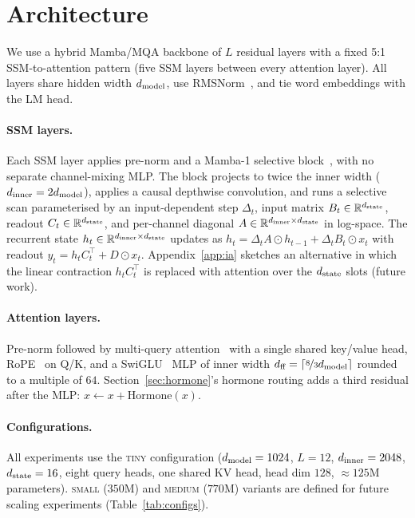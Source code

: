 \section{Architecture}
\label{sec:arch}

We use a hybrid Mamba/MQA backbone of $L$ residual layers with a fixed 5:1 SSM-to-attention pattern (five SSM layers between every attention layer). All layers share hidden width $d_{\text{model}}$, use RMSNorm~\citep{zhang2019root}, and tie word embeddings with the LM head.

\paragraph{SSM layers.} Each SSM layer applies pre-norm and a Mamba-1 selective block~\citep{gu2023mamba}, with no separate channel-mixing MLP. The block projects to twice the inner width ($d_{\text{inner}} = 2d_{\text{model}}$), applies a causal depthwise convolution, and runs a selective scan parameterised by an input-dependent step $\Delta_t$, input matrix $B_t \in \mathbb{R}^{d_{\text{state}}}$, readout $C_t \in \mathbb{R}^{d_{\text{state}}}$, and per-channel diagonal $A \in \mathbb{R}^{d_{\text{inner}} \times d_{\text{state}}}$ in log-space. The recurrent state $h_t \in \mathbb{R}^{d_{\text{inner}} \times d_{\text{state}}}$ updates as $h_t = \Delta_t A \odot h_{t-1} + \Delta_t B_t \odot x_t$ with readout $y_t = h_t C_t^\top + D \odot x_t$. Appendix~\ref{app:ia} sketches an alternative in which the linear contraction $h_t C_t^\top$ is replaced with attention over the $d_{\text{state}}$ slots (future work).

\paragraph{Attention layers.} Pre-norm followed by multi-query attention~\citep{shazeer2019fast} with a single shared key/value head, RoPE~\citep{su2021roformer} on Q/K, and a SwiGLU~\citep{shazeer2020glu} MLP of inner width $d_{\text{ff}} = \lceil \nicefrac{8}{3}d_{\text{model}} \rceil$ rounded to a multiple of $64$. Section~\ref{sec:hormone}'s hormone routing adds a third residual after the MLP: $x \leftarrow x + \text{Hormone}(x)$.

\paragraph{Configurations.} All experiments use the \textsc{tiny} configuration ($d_{\text{model}} = 1024$, $L = 12$, $d_{\text{inner}} = 2048$, $d_{\text{state}} = 16$, eight query heads, one shared KV head, head dim $128$, $\approx 125$M parameters). \textsc{small} ($350$M) and \textsc{medium} ($770$M) variants are defined for future scaling experiments (Table~\ref{tab:configs}).

